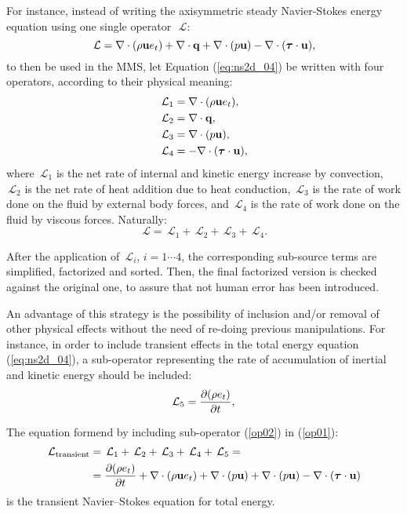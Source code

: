 \documentclass[10pt]{article}
\newcommand{\bv}[1]{\ensuremath{\mbox{\boldmath$ #1 $}}}
\newcommand{\Diff}[2] {\dfrac{\partial( #1)}{\partial #2}}
\newcommand{\Lo}{\,\mathcal{L}}
\begin{document}
For instance, instead of writing the axisymmetric steady Navier-Stokes energy equation using one single operator~$\Lo$:
\begin{equation}
 \label{eq:ns2d_04}
\Lo= \nabla \cdot (\rho\mathbf{u}e_t) +\nabla\cdot \mathbf{q} +  \nabla\cdot(p  \mathbf{u})  - \nabla \cdot (\bv{\tau} \cdot \mathbf{u}),
\end{equation}
to then be used in the MMS, let Equation (\ref{eq:ns2d_04}) be written with four operators, according to their physical meaning:
\begin{equation}
 \begin{split}
  \Lo_1&=\nabla \cdot (\rho\mathbf{u}e_t),\\
  \Lo_2&=\nabla\cdot \mathbf{q},\\
  \Lo_3&= \nabla\cdot(p  \mathbf{u}),\\
  \Lo_4&=- \nabla \cdot (\bv{\tau} \cdot \mathbf{u}),
 \end{split}
\end{equation}
where  $\Lo_1$ is the net rate of internal and kinetic energy increase by convection, $\Lo_2$ is the net rate of heat addition due to heat conduction, $\Lo_3$ is the rate of work done on the fluid by external body forces, and $\Lo_4$ is the rate of work done on the fluid by viscous forces. Naturally:
\begin{equation}
 \label{op01}
\Lo=\Lo_1+\Lo_2+\Lo_3+\Lo_4.
\end{equation}

After the application of $\Lo_i$, $i=1\cdots4$, the corresponding sub-source terms are simplified, factorized and sorted. Then, the final factorized version is checked against the original one, to assure that not human error has been introduced.

An advantage of this strategy is the possibility of inclusion and/or removal of other physical effects without the need of re-doing previous manipulations. For instance, in order to include transient effects in the total energy equation (\ref{eq:ns2d_04}), a sub-operator representing the rate of accumulation of inertial and kinetic energy should be included:
\begin{equation}
 \label{op02}
  \Lo_5=\Diff{\rho e_t}{t} ,\\
 \end{equation}

The equation formend  by including sub-operator (\ref{op02}) in (\ref{op01}):
\begin{equation*}
 \begin{split}
\Lo_{\text{transient}}&=\Lo_1+\Lo_2+\Lo_3+\Lo_4+\Lo_5=\\
&=\Diff{\rho e_t}{t}+\nabla \cdot (\rho\mathbf{u}e_t)+ \nabla\cdot(p  \mathbf{u})+\nabla\cdot(p  \mathbf{u})- \nabla \cdot (\bv{\tau} \cdot \mathbf{u})
 \end{split}
\end{equation*}
is the transient Navier--Stokes equation for total energy.
\end{document}
